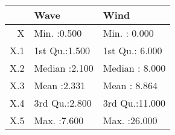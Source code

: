 \begin{tabular}{rll}
  \toprule
 &      Wave &      Wind \\ 
  \midrule
X & Min.   :0.500   & Min.   : 0.000   \\ 
  X.1 & 1st Qu.:1.500   & 1st Qu.: 6.000   \\ 
  X.2 & Median :2.100   & Median : 8.000   \\ 
  X.3 & Mean   :2.331   & Mean   : 8.864   \\ 
  X.4 & 3rd Qu.:2.800   & 3rd Qu.:11.000   \\ 
  X.5 & Max.   :7.600   & Max.   :26.000   \\ 
   \bottomrule
\end{tabular}
